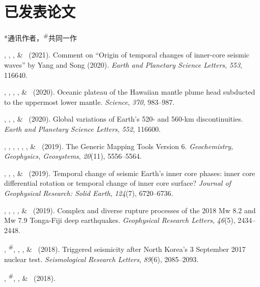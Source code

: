 \section{已发表论文}
\newcommand{\Revision}{\emph{正在审稿}}
\newcommand{\CS}{*} %
\newcommand{\CF}{\textsuperscript{\#}} %

\CS 通讯作者，\CF 共同一作
\begin{etaremune}
\item \JYao, \Me, \LSun, \& \LWen\ (2021).
	Comment on ``Origin of temporal changes of inner-core seismic waves'' by Yang and Song (2020).
	\emph{Earth and Planetary Science Letters}, \emph{553}, 116640.
\item \SWei, \PShearer, \CLithgowBertelloni, \LStixrude, \& \Me\ (2020).
	Oceanic plateau of the Hawaiian mantle plume head subducted to the uppermost lower mantle.
	\emph{Science}, \emph{370}, 983--987.
\item \Me\CS, \MLv, \SWei, \SDorfman \& \PShearer\ (2020).
	Global variations of Earth's 520- and 560-km discontinuities.
	\emph{Earth and Planetary Science Letters}, \emph{552}, 116600. \\
\item
    \PWessel, \JLuis, \LUieda, \RScharroo, \FWobbe, \WSmith, \& \Me\ (2019).
    The Generic Mapping Tools Version 6.
    \emph{Geochemistry, Geophysics, Geosystems}, \emph{20}(11), 5556--5564.
\item
    \JYao, \Me, \LSun, \& \LWen\ (2019).
    Temporal change of seismic Earth's inner core phases: inner core differential rotation or temporal change of inner core surface?
    \emph{Journal of Geophysical Research: Solid Earth}, \emph{124}(7), 6720--6736.
\item
    \WFan, \SWei, \Me, \JMcGurie, \& \DWiens\ (2019).
    Complex and diverse rupture processes of the 2018 Mw 8.2 and Mw 7.9 Tonga-Fiji deep earthquakes.
    \emph{Geophysical Research Letters}, \emph{46}(5), 2434--2448.
\item
    \JYao, \Me\CF, \ZLu, \LSun, \& \LWen\ (2018).
    Triggered seismicity after North Korea's 3 September 2017 nuclear test.
    \emph{Seismological Research Letters}, \emph{89}(6), 2085--2093.
\item
    \JYao, \Me\CF, \LSun, \& \LWen\ (2018).

\end{etaremune}
